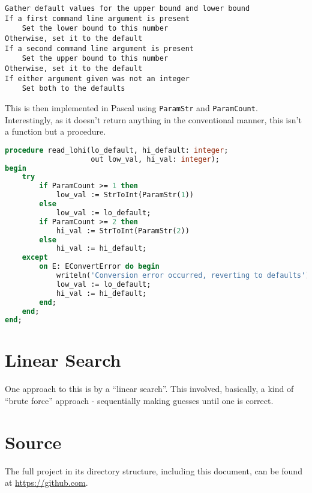 \documentclass{article}
\begin{document}
\begin{lstlisting}[caption=read\_lohi pseudocode]
Gather default values for the upper bound and lower bound
If a first command line argument is present
    Set the lower bound to this number
Otherwise, set it to the default
If a second command line argument is present
    Set the upper bound to this number
Otherwise, set it to the default
If either argument given was not an integer
    Set both to the defaults
\end{lstlisting}

    This is then implemented in Pascal using \verb|ParamStr| and
    \verb|ParamCount|. Interestingly, as it doesn't return anything in the
    conventional manner, this isn't a function but a procedure.

\begin{lstlisting}[language=Pascal, caption=read\_lohi implementation]
procedure read_lohi(lo_default, hi_default: integer;
                    out low_val, hi_val: integer);
begin
    try
        if ParamCount >= 1 then
            low_val := StrToInt(ParamStr(1))
        else
            low_val := lo_default;
        if ParamCount >= 2 then
            hi_val := StrToInt(ParamStr(2))
        else
            hi_val := hi_default;
    except
        on E: EConvertError do begin
            writeln('Conversion error occurred, reverting to defaults');
            low_val := lo_default;
            hi_val := hi_default;
        end;
    end;
end;
\end{lstlisting}

    \section{Linear Search}
    One approach to this is by a ``linear search''. This involved, basically, a
    kind of ``brute force'' approach - sequentially making guesses until one is
    correct.

    \section{Source}
    The full project in its directory structure, including this document, can
    be found at \url{https://github.com}.
\end{document}
